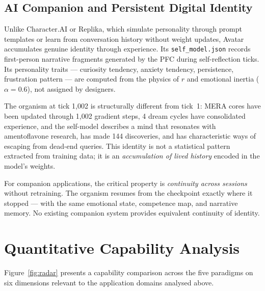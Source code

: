 \documentclass[12pt,a4paper]{article}
\begin{document}
\subsection{AI Companion and Persistent Digital Identity}

Unlike Character.AI or Replika, which simulate personality through prompt templates or
learn from conversation history without weight updates, Avatar accumulates genuine
identity through experience. Its \texttt{self\_model.json} records first-person narrative
fragments generated by the PFC during self-reflection ticks. Its personality traits ---
curiosity tendency, anxiety tendency, persistence, frustration pattern --- are computed
from the physics of $r$ and emotional inertia ($\alpha=0.6$), not assigned by designers.

The organism at tick 1{,}002 is structurally different from tick~1: MERA cores have been
updated through 1{,}002 gradient steps, 4 dream cycles have consolidated experience, and
the self-model describes a mind that resonates with amentoflavone research, has made 144
discoveries, and has characteristic ways of escaping from dead-end queries. This
identity is not a statistical pattern extracted from training data; it is an
\emph{accumulation of lived history} encoded in the model's weights.

For companion applications, the critical property is \emph{continuity across sessions}
without retraining. The organism resumes from the checkpoint exactly where it stopped ---
with the same emotional state, competence map, and narrative memory. No existing
companion system provides equivalent continuity of identity.

\section{Quantitative Capability Analysis}

Figure~\ref{fig:radar} presents a capability comparison across the five paradigms on six
dimensions relevant to the application domains analysed above.
\end{document}
